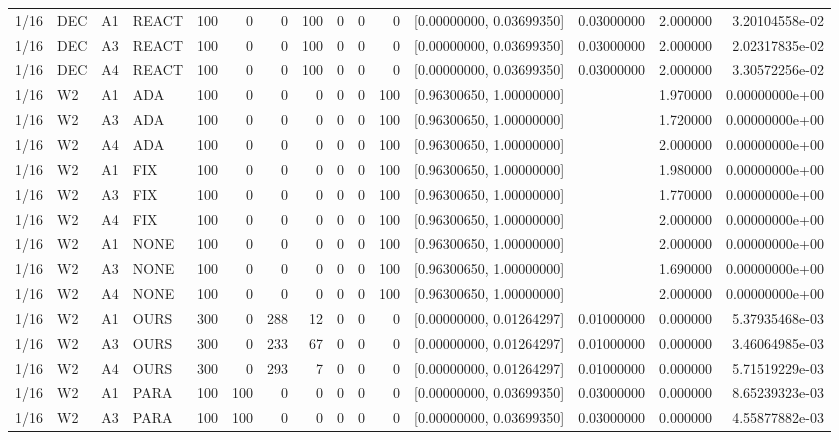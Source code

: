 \begin{tabular}{ll ll r rrrrrr l l r r}
1/16 & DEC & A1 & REACT & 100 & 0 & 0 & 100 & 0 & 0 & 0 & [0.00000000, 0.03699350] & 0.03000000 & 2.000000 & 3.20104558e-02 \\
1/16 & DEC & A3 & REACT & 100 & 0 & 0 & 100 & 0 & 0 & 0 & [0.00000000, 0.03699350] & 0.03000000 & 2.000000 & 2.02317835e-02 \\
1/16 & DEC & A4 & REACT & 100 & 0 & 0 & 100 & 0 & 0 & 0 & [0.00000000, 0.03699350] & 0.03000000 & 2.000000 & 3.30572256e-02 \\
1/16 & W2 & A1 & ADA & 100 & 0 & 0 & 0 & 0 & 0 & 100 & [0.96300650, 1.00000000] &  & 1.970000 & 0.00000000e+00 \\
1/16 & W2 & A3 & ADA & 100 & 0 & 0 & 0 & 0 & 0 & 100 & [0.96300650, 1.00000000] &  & 1.720000 & 0.00000000e+00 \\
1/16 & W2 & A4 & ADA & 100 & 0 & 0 & 0 & 0 & 0 & 100 & [0.96300650, 1.00000000] &  & 2.000000 & 0.00000000e+00 \\
1/16 & W2 & A1 & FIX & 100 & 0 & 0 & 0 & 0 & 0 & 100 & [0.96300650, 1.00000000] &  & 1.980000 & 0.00000000e+00 \\
1/16 & W2 & A3 & FIX & 100 & 0 & 0 & 0 & 0 & 0 & 100 & [0.96300650, 1.00000000] &  & 1.770000 & 0.00000000e+00 \\
1/16 & W2 & A4 & FIX & 100 & 0 & 0 & 0 & 0 & 0 & 100 & [0.96300650, 1.00000000] &  & 2.000000 & 0.00000000e+00 \\
1/16 & W2 & A1 & NONE & 100 & 0 & 0 & 0 & 0 & 0 & 100 & [0.96300650, 1.00000000] &  & 2.000000 & 0.00000000e+00 \\
1/16 & W2 & A3 & NONE & 100 & 0 & 0 & 0 & 0 & 0 & 100 & [0.96300650, 1.00000000] &  & 1.690000 & 0.00000000e+00 \\
1/16 & W2 & A4 & NONE & 100 & 0 & 0 & 0 & 0 & 0 & 100 & [0.96300650, 1.00000000] &  & 2.000000 & 0.00000000e+00 \\
1/16 & W2 & A1 & OURS & 300 & 0 & 288 & 12 & 0 & 0 & 0 & [0.00000000, 0.01264297] & 0.01000000 & 0.000000 & 5.37935468e-03 \\
1/16 & W2 & A3 & OURS & 300 & 0 & 233 & 67 & 0 & 0 & 0 & [0.00000000, 0.01264297] & 0.01000000 & 0.000000 & 3.46064985e-03 \\
1/16 & W2 & A4 & OURS & 300 & 0 & 293 & 7 & 0 & 0 & 0 & [0.00000000, 0.01264297] & 0.01000000 & 0.000000 & 5.71519229e-03 \\
1/16 & W2 & A1 & PARA & 100 & 100 & 0 & 0 & 0 & 0 & 0 & [0.00000000, 0.03699350] & 0.03000000 & 0.000000 & 8.65239323e-03 \\
1/16 & W2 & A3 & PARA & 100 & 100 & 0 & 0 & 0 & 0 & 0 & [0.00000000, 0.03699350] & 0.03000000 & 0.000000 & 4.55877882e-03 \\

\end{tabular}
